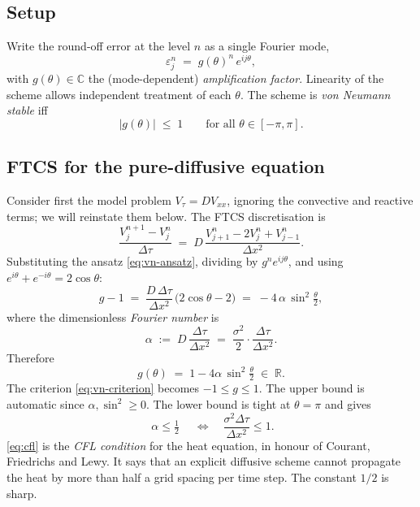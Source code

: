 \documentclass[11pt,a4paper]{article}
\begin{document}
\subsection{Setup}

Write the round-off error at the level $n$ as a single Fourier mode,
\begin{equation}
\varepsilon_j^n \;=\; g(\theta)^n\, e^{ij\theta},
\label{eq:vn-ansatz}
\end{equation}
with $g(\theta) \in \mathbb{C}$ the (mode-dependent) \emph{amplification
factor}. Linearity of the scheme allows independent treatment of each
$\theta$. The scheme is \emph{von Neumann stable} iff
\begin{equation}
|g(\theta)| \;\le\; 1
\qquad
\text{for all }\theta \in [-\pi, \pi].
\label{eq:vn-criterion}
\end{equation}

\subsection{FTCS for the pure-diffusive equation}

Consider first the model problem $V_\tau = D V_{xx}$, ignoring the
convective and reactive terms; we will reinstate them below. The FTCS
discretisation is
\[
\frac{V_j^{n+1} - V_j^n}{\Delta \tau}
\;=\; D\,\frac{V_{j+1}^n - 2 V_j^n + V_{j-1}^n}{\Delta x^2}.
\]
Substituting the ansatz \eqref{eq:vn-ansatz}, dividing by
$g^n e^{ij\theta}$, and using $e^{i\theta} + e^{-i\theta} = 2\cos\theta$:
\[
g - 1 \;=\; \frac{D\,\Delta\tau}{\Delta x^2}\,
   \bigl(2\cos\theta - 2\bigr)
\;=\; -4\,\alpha\,\sin^2\!\tfrac{\theta}{2},
\]
where the dimensionless \emph{Fourier number} is
\begin{equation}
\alpha \;:=\; D\,\frac{\Delta\tau}{\Delta x^2}
       \;=\; \frac{\sigma^2}{2}\cdot\frac{\Delta\tau}{\Delta x^2}.
\label{eq:fourier-number}
\end{equation}
Therefore
\[
g(\theta) \;=\; 1 - 4\alpha\,\sin^2\!\tfrac{\theta}{2}\;\in\;\mathbb{R}.
\]
The criterion \eqref{eq:vn-criterion} becomes $-1 \le g \le 1$. The
upper bound is automatic since $\alpha,\sin^2 \ge 0$. The lower bound
is tight at $\theta = \pi$ and gives
\begin{equation}
\boxed{\;\alpha \le \tfrac{1}{2}\;}\quad \iff \quad
\frac{\sigma^2 \Delta\tau}{\Delta x^2} \le 1.
\label{eq:cfl}
\end{equation}
\eqref{eq:cfl} is the \emph{CFL condition} for the heat equation, in
honour of Courant, Friedrichs and Lewy. It says that an explicit
diffusive scheme cannot propagate the heat by more than half a grid
spacing per time step. The constant $1/2$ is sharp.
\end{document}

